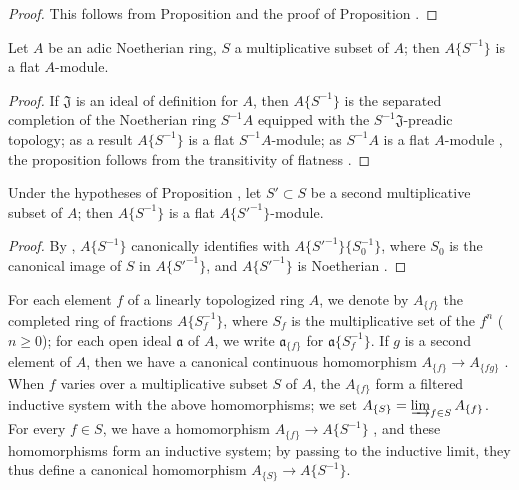 \begin{proof}
This follows from Proposition  and the proof of
Proposition .
\end{proof}

\begin{proposition}[7.6.13]
\label{0.7.6.13}
Let $A$ be an adic Noetherian ring, $S$ a multiplicative subset of $A$; then $A\{S^{-1}\}$ is a
flat $A$-module.
\end{proposition}

\begin{proof}
If $\mathfrak{J}$ is an ideal of definition for $A$, then $A\{S^{-1}\}$ is the separated completion
of the Noetherian ring $S^{-1}A$ equipped with the $S^{-1}\mathfrak{J}$-preadic topology; as a result
 $A\{S^{-1}\}$ is a flat $S^{-1}A$-module; as $S^{-1}A$ is a flat
$A$-module , the proposition follows from the transitivity of flatness .
\end{proof}

\begin{corollary}[7.6.14]
\label{0.7.6.14}
Under the hypotheses of Proposition , let $S'\subset S$ be a second
multiplicative subset of $A$; then $A\{S^{-1}\}$ is a flat $A\{{S'}^{-1}\}$-module.
\end{corollary}

\begin{proof}
By , $A\{S^{-1}\}$ canonically identifies with
$A\{{S'}^{-1}\}\{S_0^{-1}\}$, where $S_0$ is the canonical image of $S$ in $A\{{S'}^{-1}\}$, and
$A\{{S'}^{-1}\}$ is Noetherian .
\end{proof}

\begin{env}[7.6.15]
\label{0.7.6.15}
For each element $f$ of a linearly topologized ring $A$, we denote by $A_{\{f\}}$ the completed
ring of fractions $A\{S_f^{-1}\}$, where $S_f$ is the multiplicative set of the $f^n$
($n\geq 0$); for each open ideal $\mathfrak{a}$ of $A$, we write $\mathfrak{a}_{\{f\}}$ for
$\mathfrak{a}\{S_f^{-1}\}$. If $g$ is a second element of $A$, then we have a canonical continuous
homomorphism $A_{\{f\}}\to A_{\{fg\}}$ . When $f$ varies over a
multiplicative subset $S$ of $A$, the $A_{\{f\}}$ form a filtered inductive system with the above
homomorphisms; we set $A_{\{S\}}=\varinjlim_{f\in S}A_{\{f\}}$. For every $f\in S$, we have a
homomorphism $A_{\{f\}}\to A\{S^{-1}\}$ , and
these homomorphisms form an inductive system; by passing to the inductive limit, they thus define
a canonical homomorphism $A_{\{S\}}\to A\{S^{-1}\}$.
\end{env}

